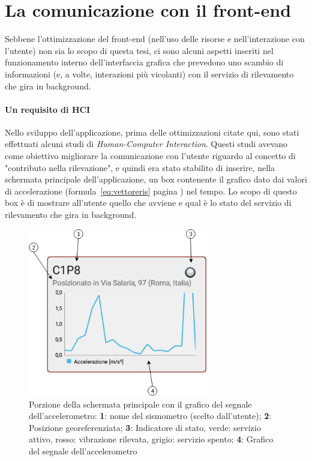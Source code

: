 \documentclass[a4paper,10pt]{memoir}
\begin{document}
\clearpage

\section{La comunicazione con il front-end}

Sebbene l'ottimizzazione del front-end (nell'uso delle risorse e nell'interazione con l'utente) non sia lo scopo di questa tesi, ci sono alcuni aspetti inseriti nel funzionamento interno dell'interfaccia grafica che prevedono uno scambio di informazioni (e, a volte, interazioni più vicolanti) con il servizio di rilevamento che gira in background.

\paragraph{Un requisito di HCI} Nello sviluppo dell'applicazione, prima delle ottimizzazioni citate qui, sono stati effettuati alcuni studi di \textit{Human-Computer Interaction}. Questi studi avevano come obiettivo migliorare la comunicazione con l'utente riguardo al concetto di "contributo nella rilevazione", e quindi era stato stabilito di inserire, nella schermata principale dell'applicazione, un box contenente il grafico dato dai valori di accelerazione (formula~\ref{eq:vettoreris} pagina \pageref{eq:vettoreris}) nel tempo. Lo scopo di questo box è di mostrare all'utente quello che avviene e qual è lo stato del servizio di rilevamento che gira in background.

\begin{figure}[ht]
\centering
\includegraphics[width=0.7\textwidth]{app/activitychart2}
\caption{Porzione della schermata principale con il grafico del segnale dell'accelerometro: \textbf{1}: nome del sismometro (scelto dall'utente); \textbf{2}: Posizione georeferenziata; \textbf{3}: Indicatore di stato, verde: servizio attivo, rosso: vibrazione rilevata, grigio: servizio spento; \textbf{4}: Grafico del segnale dell'accelerometro}
\label{fig:activitychart}
\end{figure}
\end{document}
